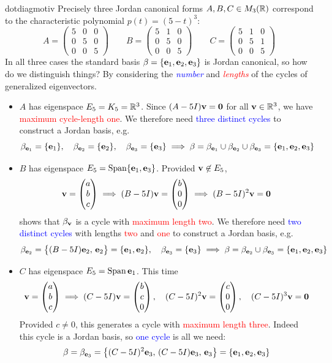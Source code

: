 \begin{example}{}{dotdiagmotiv}
	Precisely three Jordan canonical forms $A,B,C\in M_3(\mathbb{R})$ correspond to the characteristic polynomial $p(t)=(5-t)^3$:
	\[
		A=
		\begin{pmatrix}
			5&0&0\\
			0&5&0\\
			0&0&5
		\end{pmatrix}
		\qquad
		B=\begin{pmatrix}
			5&1&0\\
			0&5&0\\
			0&0&5
		\end{pmatrix}
		\qquad
		C=\begin{pmatrix}
			5&1&0\\
			0&5&1\\
			0&0&5
		\end{pmatrix}
	\]
	In all three cases the standard basis $\beta=\{{\mathbf{e}}_1,{\mathbf{e}}_2,{\mathbf{e}}_3\}$ is Jordan canonical, so how do we distinguish things? By considering the \emph{\textcolor{blue}{number}} and \emph{\textcolor{red}{lengths}} of the cycles of generalized eigenvectors.
	\begin{itemize}
	  \item $A$ has eigenspace $E_5=K_5=\mathbb{R}^3$. Since $(A-5I){\mathbf{v}}=\mathbf{0}$ for all ${\mathbf{v}}\in\mathbb{R}^3$, we have \textcolor{red}{maximum cycle-length one}. We therefore need \textcolor{blue}{three distinct cycles} to construct a Jordan basis, e.g.
	  \[
		  \beta_{{\mathbf{e}}_1}=\{{\mathbf{e}}_1\},\quad 
		  \beta_{{\mathbf{e}}_2}=\{{\mathbf{e}}_2\},\quad 
		  \beta_{{\mathbf{e}}_3}=\{{\mathbf{e}}_3\} 
		  \implies \beta=\beta_{{\mathbf{e}}_1}\cup\beta_{{\mathbf{e}}_2}\cup\beta_{{\mathbf{e}}_3}
		  =\{{\mathbf{e}}_1,{\mathbf{e}}_2,{\mathbf{e}}_3\}
	  \]
	  
	  \item $B$ has eigenspace $E_5=\operatorname{Span}\{{\mathbf{e}}_1,{\mathbf{e}}_3\}$. Provided ${\mathbf{v}}\not\in E_5$,
	  \[
	  	{\mathbf{v}}=\begin{pmatrix}a\\b\\c\end{pmatrix}\implies (B-5I){\mathbf{v}}=\begin{pmatrix}b\\0\\0\end{pmatrix} \implies (B-5I)^2{\mathbf{v}}=\mathbf{0}
	  \]
	  shows that $\beta_{\mathbf{v}}$ is a cycle with \textcolor{red}{maximum length two}. We therefore need \textcolor{blue}{two distinct cycles} with lengths \textcolor{red}{two} and \textcolor{red}{one} to construct a Jordan basis, e.g.
	  \[
	  	\beta_{{\mathbf{e}}_2}=\bigl\{(B-5I){\mathbf{e}}_2,\,{\mathbf{e}}_2\bigr\}=\{{\mathbf{e}}_1,{\mathbf{e}}_2\},\quad 
	  	\beta_{{\mathbf{e}}_3}=\{{\mathbf{e}}_3\}
	  	\implies \beta=\beta_{{\mathbf{e}}_2}\cup\beta_{{\mathbf{e}}_3}=\{{\mathbf{e}}_1,{\mathbf{e}}_2,{\mathbf{e}}_3\}
	 	\]
	  
	  \item $C$ has eigenspace $E_5=\operatorname{Span}{\mathbf{e}}_1$. This time
	  \[
	  	{\mathbf{v}}=\begin{pmatrix}a\\b\\c\end{pmatrix}
	  	\implies (C-5I){\mathbf{v}}=\begin{pmatrix}b\\c\\0\end{pmatrix},\quad 
	  	(C-5I)^2{\mathbf{v}}=\begin{pmatrix}c\\0\\0\end{pmatrix},\quad (C-5I)^3{\mathbf{v}}=\mathbf{0}
	  \]
	  Provided $c\neq 0$, this generates a cycle with \textcolor{red}{maximum length three}. Indeed this cycle is a Jordan basis, so \textcolor{blue}{one cycle} is all we need:
	  \[
	  	\beta=\beta_{{\mathbf{e}}_3}=\bigl\{(C-5I)^2{\mathbf{e}}_3,\,(C-5I){\mathbf{e}}_3,\,{\mathbf{e}}_3\bigr\}=\{{\mathbf{e}}_1,{\mathbf{e}}_2,{\mathbf{e}}_3\}
	  \]\vspace{-5pt}
	\end{itemize}
\end{example}

